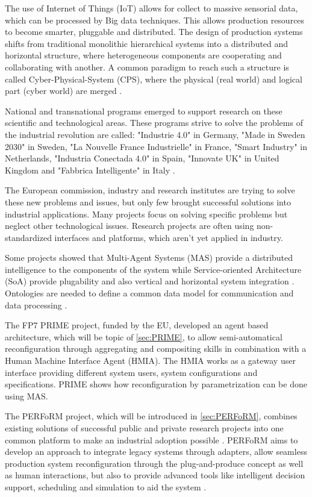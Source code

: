 \documentclass[conference,compsoc,hidelinks]{IEEEtran}
\begin{document}
The use of Internet of Things (IoT) allows for collect to massive sensorial data, which can be processed by Big data techniques. This allows production resources to become smarter, pluggable and distributed. The design of production systems shifts from traditional monolithic hierarchical systems into a distributed and horizontal structure, where heterogeneous components are cooperating and collaborating with another. A common paradigm to reach such a structure is called Cyber-Physical-System (CPS), where the physical (real world) and logical part (cyber world) are merged \cite{SpecPERFoRM}.

National and transnational programs emerged to support research on these scientific and technological areas. These programs strive to solve the problems of the industrial revolution are called: "Industrie 4.0" in Germany, "Made in Sweden 2030" in Sweden, "La Nouvelle France Industrielle" in France, "Smart Industry" in Netherlands, "Industria Conectada 4.0" in Spain, "Innovate UK" in United Kingdom and "Fabbrica Intelligente" in Italy \cite{SpecPERFoRM}. 

The European commission, industry and research institutes are trying to solve these new problems and issues, but only few brought successful solutions into industrial applications. Many projects focus on solving specific problems but neglect other technological issues. Research projects are often using non-standardized interfaces and platforms, which aren't yet applied in industry. 

Some projects showed that Multi-Agent Systems (MAS) provide a distributed intelligence to the components of the system while Service-oriented Architecture (SoA) provide plugability and also vertical and horizontal system integration \cite{Colombo2009}. Ontologies are needed to define a common data model for communication and data processing \cite{Peres2017}.

The FP7 PRIME project, funded by the EU, developed an agent based architecture, which will be topic of \autoref{sec:PRIME}, to allow semi-automatical reconfiguration through aggregating and compositing skills in combination with a Human Machine Interface Agent (HMIA). The HMIA works as a gateway user interface providing different system users, system configurations and specifications. PRIME shows how reconfiguration by parametrization can be done using MAS.

The PERFoRM project, which will be introduced in \autoref{sec:PERFoRM}, combines existing solutions of successful public and private research projects into one common platform to make an industrial adoption possible \cite{HarmonizedSystems}. PERFoRM aims to develop an approach to integrate legacy systems through adapters, allow seamless production system reconfiguration through the plug-and-produce concept as well as human interactions, but also to provide advanced tools like intelligent decision support, scheduling and simulation to aid the system \cite{SpecPERFoRM}.
\end{document}
